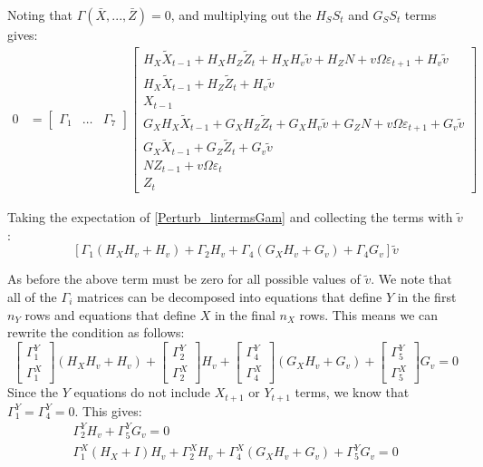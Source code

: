 \documentclass[letterpaper,12pt]{article}
\newcommand{\ve}{\varepsilon}
\theoremstyle{definition}
\begin{document}
\begin{spacing}{1.5}
		Noting that $\Gamma(\bar X, ..., \bar Z) = 0$, and multiplying out the $H_S S_t$ and $G_S S_t$ terms gives:
		\begin{equation} \label{Perturb_lintermsGam}
		\begin{split}
		0 & =\begin{bmatrix} \Gamma_1 & \dots & \Gamma_7 \end{bmatrix} 
		\begin{bmatrix}
			H_X \tilde X_{t-1} + H_X H_Z \tilde Z_t + H_X H_v \tilde v + H_Z N + v \Omega \ve_{t+1} + H_v \tilde v \\
			H_X \tilde X_{t-1} + H_Z \tilde Z_t + H_v \tilde v \\ 
			X_{t-1} \\ 
			G_X H_X \tilde X_{t-1} + G_X H_Z \tilde Z_t + G_X H_v \tilde v + G_Z N + v \Omega \ve_{t+1} + G_v \tilde v \\ 
			G_X \tilde X_{t-1} + G_Z \tilde Z_t + G_v \tilde v
			\\ N Z_{t-1} + v \Omega \ve_t 
			\\ Z_t \end{bmatrix}
		\end{split}
		\end{equation}

		Taking the expectation of \eqref{Perturb_lintermsGam} and collecting the terms with $\tilde v$:
		\begin{equation} \nonumber
			\left[\Gamma_1 (H_X H_v + H_v) + \Gamma_2 H_v + \Gamma_4 (G_X H_v + G_v) + \Gamma_4 G_v \right] \tilde v
		\end{equation}

		As before the above term must be zero for all possible values of $\tilde v$.  We note that all of the $\Gamma_i$ matrices can be decomposed into equations that define $Y$ in the first $n_Y$ rows and equations that define $X$ in the final $n_X$ rows.  This means we can rewrite the condition as follows:
		\begin{equation} \nonumber
			\begin{bmatrix} \Gamma^Y_1 \\ \Gamma^X_1 \end{bmatrix} (H_X H_v + H_v) + \begin{bmatrix} \Gamma^Y_2 \\ \Gamma^X_2 \end{bmatrix} H_v + \begin{bmatrix} \Gamma^Y_4 \\ \Gamma^X_4 \end{bmatrix} (G_X H_v + G_v) + \begin{bmatrix} \Gamma^Y_5 \\ \Gamma^X_5 \end{bmatrix} G_v = 0
		\end{equation}
		Since the $Y$ equations do not include $X_{t+1}$ or $Y_{t+1}$ terms, we know that $\Gamma^Y_1 = \Gamma^Y_4 = 0$.
		This gives:
		\begin{align}
			\Gamma^Y_2 H_v + \Gamma^Y_5 G_v = 0 \nonumber \\
			\Gamma^X_1 (H_X + I) H_v + \Gamma^X_2 H_v + \Gamma^X_4 (G_X H_v + G_v) + \Gamma^Y_5 G_v = 0 \nonumber
		\end{align}


\end{spacing}
\end{document}
